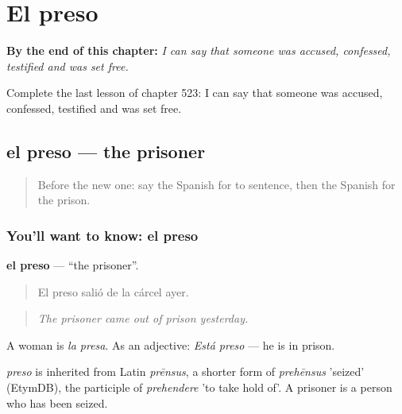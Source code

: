 
\chapter{El preso}
\label{ch:es-el-preso}

\begin{chapteropening}
\textbf{By the end of this chapter:} \emph{I can say that someone was accused, confessed, testified and was set free.}

Complete the last lesson of chapter 523: I can say that someone was accused, confessed, testified and was set free.
\end{chapteropening}

\section[el preso]{el preso — the prisoner}

\label{lesson:ES-C523-preso}



\begin{quote}
Before the new one: say the Spanish for to sentence, then the Spanish for the prison.
\end{quote}

\subsection*{You'll want to know: el preso}
\textbf{el preso} — \textquotedblleft{}the prisoner\textquotedblright{}.

\begin{quote}
El preso salió de la cárcel ayer.
\end{quote}

\begin{quote}
\emph{The prisoner came out of prison yesterday.}
\end{quote}

A woman is \emph{la presa}. As an adjective: \emph{Está preso} — he is in prison.

\begin{cousinweb}
\emph{preso} is inherited from Latin \emph{prēnsus}, a shorter form of \emph{prehēnsus} 'seized' (EtymDB), the participle of \emph{prehendere} 'to take hold of'. A prisoner is a person who has been seized.
\end{cousinweb}

